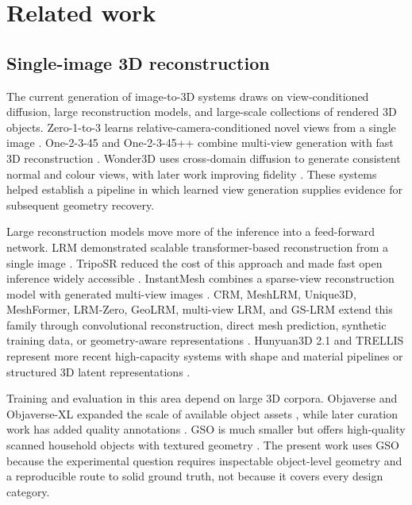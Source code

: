\documentclass[12pt,a4paper]{article}
\begin{document}
\section{Related work}

\subsection{Single-image 3D reconstruction}

The current generation of image-to-3D systems draws on view-conditioned diffusion, large reconstruction models, and large-scale collections of rendered 3D objects. Zero-1-to-3 learns relative-camera-conditioned novel views from a single image \parencite{liu2023zero123}. One-2-3-45 and One-2-3-45++ combine multi-view generation with fast 3D reconstruction \parencite{liu2023one2345,liu2023one2345pp}. Wonder3D uses cross-domain diffusion to generate consistent normal and colour views, with later work improving fidelity \parencite{long2023wonder3d,long2025wonder3dpp}. These systems helped establish a pipeline in which learned view generation supplies evidence for subsequent geometry recovery.

Large reconstruction models move more of the inference into a feed-forward network. LRM demonstrated scalable transformer-based reconstruction from a single image \parencite{hong2023lrm}. TripoSR reduced the cost of this approach and made fast open inference widely accessible \parencite{tochilkin2024triposr}. InstantMesh combines a sparse-view reconstruction model with generated multi-view images \parencite{xu2024instantmesh}. CRM, MeshLRM, Unique3D, MeshFormer, LRM-Zero, GeoLRM, multi-view LRM, and GS-LRM extend this family through convolutional reconstruction, direct mesh prediction, synthetic training data, or geometry-aware representations \parencite{wang2024crm,wei2024meshlrm,wu2024unique3d,liu2024meshformer,xie2024lrmzero,zhang2024geolrm,li2024mvlrm,zhang2024gslrm}. Hunyuan3D 2.1 and TRELLIS represent more recent high-capacity systems with shape and material pipelines or structured 3D latent representations \parencite{hunyuan3d2025,xiang2025trellis}.

Training and evaluation in this area depend on large 3D corpora. Objaverse and Objaverse-XL expanded the scale of available object assets \parencite{deitke2022objaverse,deitke2023objaversexl}, while later curation work has added quality annotations \parencite{lin2025objaversepp}. GSO is much smaller but offers high-quality scanned household objects with textured geometry \parencite{downs2022gso}. The present work uses GSO because the experimental question requires inspectable object-level geometry and a reproducible route to solid ground truth, not because it covers every design category.
\end{document}
